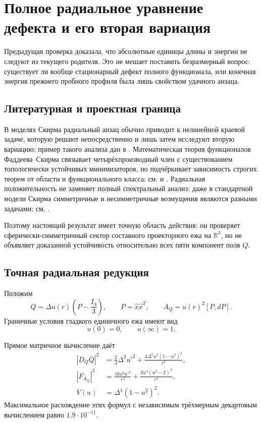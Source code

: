 \chapter{Полное радиальное уравнение дефекта и его вторая вариация}

Предыдущая проверка доказала, что абсолютные единицы длины и энергии не
следуют из текущего родителя. Это не мешает поставить безразмерный вопрос:
существует ли вообще стационарный дефект полного функционала, или конечная
энергия прежнего пробного профиля была лишь свойством удачного анзаца.

\section{Литературная и проектная граница}

В моделях Скирма радиальный анзац обычно приводит к нелинейной краевой
задаче, которую решают непосредственно и лишь затем исследуют вторую
вариацию; пример такого анализа дан в .
Математическая теория функционалов Фаддеева--Скирма связывает
четырёхпроизводный член с существованием топологически устойчивых
минимизаторов, но подчёркивает зависимость строгих теорем от области и
функционального класса; см.  и
. Радиальная положительность не заменяет полный
спектральный анализ: даже в стандартной модели Скирма симметричные и
несимметричные возмущения являются разными задачами; см.
.

Поэтому настоящий результат имеет точную область действия: он проверяет
сферически-симметричный сектор составного проекторного ежа на
$\mathbb R^3$, но не объявляет доказанной устойчивость относительно всех
пяти компонент поля $Q$.

\section{Точная радиальная редукция}

Положим
\begin{equation}
 Q=\Delta u(r)\left(P-\frac{I_3}{3}\right),
 \qquad
 P=\widehat x\widehat x^T,
 \qquad
 A_Q=u(r)^2[P,dP].
\end{equation}
Граничные условия гладкого единичного ежа имеют вид
\begin{equation}
 u(0)=0,
 \qquad
 u(\infty)=1.
 \label{eq:v6-bosonic-radial-boundary-conditions}
\end{equation}

Прямое матричное вычисление даёт
\begin{align}
 |D_QQ|^2
 &=\frac23\Delta^2u'^2
 +\frac{4\Delta^2u^2(1-u^2)^2}{r^2},\\
 |F_{A_Q}|^2
 &=\frac{16u^2u'^2}{r^2}
 +\frac{2u^4(u^2-2)^2}{r^4},\\
 V(u)&=\Delta^4(1-u^2)^2.
 \label{eq:v6-bosonic-radial-densities}
\end{align}
Максимальное расхождение этих формул с независимым трёхмерным
декартовым вычислением равно $1.9\cdot10^{-11}$.

